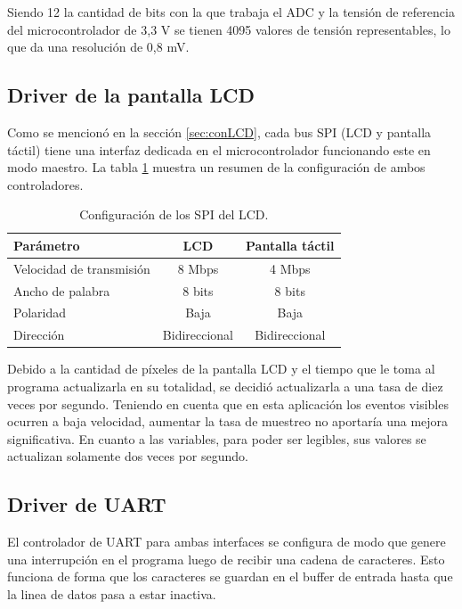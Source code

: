 Siendo 12 la cantidad de bits con la que trabaja el ADC y la tensión de referencia del microcontrolador de 3,3 V se tienen 4095 valores de tensión representables, lo que da una resolución de 0,8 mV.

\subsection{Driver de la pantalla LCD}

Como se mencionó en la sección \ref{sec:conLCD}, cada bus SPI (LCD y pantalla táctil) tiene una interfaz dedicada en el microcontrolador funcionando este en modo maestro. La tabla \ref{tab:configSPI} muestra un resumen de la configuración de ambos controladores.

\begin{table}[H]
	\centering
	\caption{Configuración de los SPI del LCD.}
	\begin{tabular}{l c c}
		\toprule
		\textbf{Parámetro} & \textbf{LCD} & \textbf{Pantalla táctil} \\
		\midrule
		Velocidad de transmisión	& 8 Mbps & 4 Mbps	\\
		Ancho de palabra 				& 8 bits & 8 bits	    \\
		Polaridad							& Baja & Baja \\
		Dirección							& Bidireccional & Bidireccional \\
		\bottomrule
		\hline
	\end{tabular}
	\label{tab:configSPI}
\end{table}

Debido a la cantidad de píxeles de la pantalla LCD y el tiempo que le toma al programa actualizarla en su totalidad, se decidió actualizarla a una tasa de diez veces por segundo. Teniendo en cuenta que en esta aplicación los eventos visibles ocurren a baja velocidad, aumentar la tasa de muestreo no aportaría una mejora significativa. En cuanto a las variables, para poder ser legibles, sus valores se actualizan solamente dos veces por segundo.

\subsection{Driver de UART}

El controlador de UART para ambas interfaces se configura de modo que genere una interrupción en el programa luego de recibir una cadena de caracteres. Esto funciona de forma que los caracteres se guardan en el buffer de entrada hasta que la linea de datos pasa a estar inactiva.


